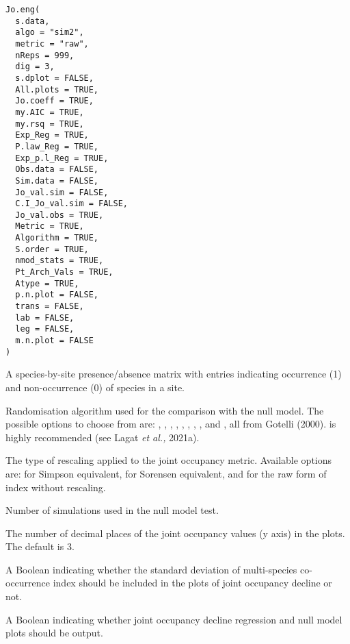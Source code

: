 \documentclass[a4paper]{book}
\begin{document}
%
\begin{Usage}
\begin{verbatim}
Jo.eng(
  s.data,
  algo = "sim2",
  metric = "raw",
  nReps = 999,
  dig = 3,
  s.dplot = FALSE,
  All.plots = TRUE,
  Jo.coeff = TRUE,
  my.AIC = TRUE,
  my.rsq = TRUE,
  Exp_Reg = TRUE,
  P.law_Reg = TRUE,
  Exp_p.l_Reg = TRUE,
  Obs.data = FALSE,
  Sim.data = FALSE,
  Jo_val.sim = FALSE,
  C.I_Jo_val.sim = FALSE,
  Jo_val.obs = TRUE,
  Metric = TRUE,
  Algorithm = TRUE,
  S.order = TRUE,
  nmod_stats = TRUE,
  Pt_Arch_Vals = TRUE,
  Atype = TRUE,
  p.n.plot = FALSE,
  trans = FALSE,
  lab = FALSE,
  leg = FALSE,
  m.n.plot = FALSE
)
\end{verbatim}
\end{Usage}
%
\begin{Arguments}
\begin{ldescription}
\item[\code{s.data}] A species-by-site presence/absence matrix with entries indicating
occurrence (1) and non-occurrence (0) of species in a site.

\item[\code{algo}] Randomisation algorithm used for the comparison with the null model. The
possible options to choose from are: , , , , , ,
, , and , all from Gotelli (2000).  is highly recommended
(see Lagat \emph{et al.,} 2021a).

\item[\code{metric}] The type of rescaling applied to the joint occupancy metric. Available options are:
 for Simpson equivalent,  for Sorensen equivalent, and  for the
raw form of index without rescaling.

\item[\code{nReps}] Number of simulations used in the null model test.

\item[\code{dig}] The number of decimal places of the joint occupancy values (y axis) in the plots.
The default is 3.

\item[\code{s.dplot}] A Boolean indicating whether the standard deviation
of multi-species co-occurrence index should be included in the plots of joint occupancy
decline or not.

\item[\code{All.plots}] A Boolean indicating whether joint occupancy decline  regression
and null model plots should be output.


\end{ldescription}
\end{Arguments}
\end{document}
